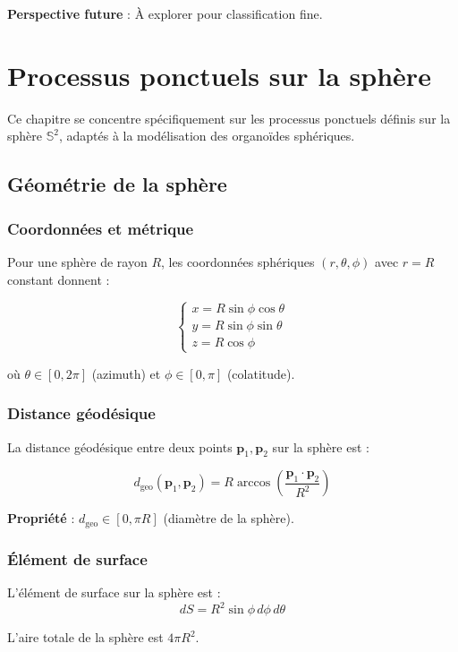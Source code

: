 \textbf{Perspective future} : À explorer pour classification fine.

\chapter{Processus ponctuels sur la sphère}

Ce chapitre se concentre spécifiquement sur les processus ponctuels définis sur la sphère $\mathbb{S}^2$, adaptés à la modélisation des organoïdes sphériques.

\section{Géométrie de la sphère}

\subsection{Coordonnées et métrique}

Pour une sphère de rayon $R$, les coordonnées sphériques $(r, \theta, \phi)$ avec $r = R$ constant donnent :

\[
\begin{cases}
x = R\sin\phi\cos\theta \\
y = R\sin\phi\sin\theta \\
z = R\cos\phi
\end{cases}
\]

où $\theta \in [0, 2\pi]$ (azimuth) et $\phi \in [0, \pi]$ (colatitude).

\subsection{Distance géodésique}

La distance géodésique entre deux points $\mathbf{p}_1, \mathbf{p}_2$ sur la sphère est :

\[
d_{\text{geo}}(\mathbf{p}_1, \mathbf{p}_2) = R \arccos\left(\frac{\mathbf{p}_1 \cdot \mathbf{p}_2}{R^2}\right)
\]

\textbf{Propriété} : $d_{\text{geo}} \in [0, \pi R]$ (diamètre de la sphère).

\subsection{Élément de surface}

L'élément de surface sur la sphère est :
\[
dS = R^2 \sin\phi \, d\phi \, d\theta
\]

L'aire totale de la sphère est $4\pi R^2$.

